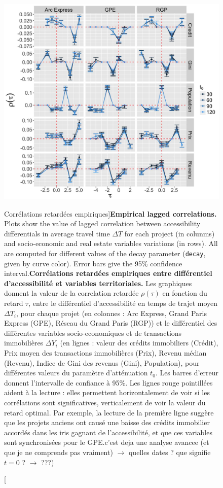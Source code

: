 



\begin{figure}[h!]
\includegraphics[width=\linewidth]{Figures/Final/1-2-1-fig-casestudies-empiricalres.jpg}
\caption[Empirical lagged correlations][Corrélations retardées empiriques]{\textbf{Empirical lagged correlations.} Plots show the value of lagged correlation between accessibility differentials in average travel time $\Delta T$ for each project (in colunms) and socio-economic and real estate variables variations (in rows). All are computed for different values of the decay parameter (\texttt{decay}, given by curve color). Error bars give the 95\% confidence interval.\label{fig:empiricalres}}{\textbf{Corrélations retardées empiriques entre différentiel d'accessibilité et variables territoriales.} Les graphiques donnent la valeur de la correlation retardée $\rho(\tau)$ en fonction du retard $\tau$, entre le différentiel d'accessibilité en temps de trajet moyen $\Delta T_i$, pour chaque projet (en colonnes : Arc Express, Grand Paris Express (GPE), Réseau du Grand Paris (RGP)) et le différentiel des différentes variables socio-economiques et de transactions immobilières $\Delta Y_i$ (en lignes : valeur des crédits immobiliers (Crédit), Prix moyen des transactions immobilières (Prix), Revenu médian (Revenu), Indice de Gini des revenus (Gini), Population), pour différentes valeurs du paramètre d'atténuation $t_0$. Les barres d'erreur donnent l'intervalle de confiance à 95\%. Les lignes rouge pointillées aident à la lecture : elles permettent horizontalement de voir si les corrélations sont significatives, verticalement de voir la valeur du retard optimal. Par exemple, la lecture de la première ligne suggère que les projets anciens ont causé une baisse des crédits immobilier accordés dans les iris gagnant de l'accessibilité, et que ces variables sont synchronisées pour le GPE.\label{fig:casestudies:empiricalres}\comment[FL]{}c'est deja une analyse avancee (et que je ne comprends pas vraiment) $\rightarrow$ quelles dates ? que signifie $t=0$ ? $\rightarrow$ ???)}
\end{figure}
